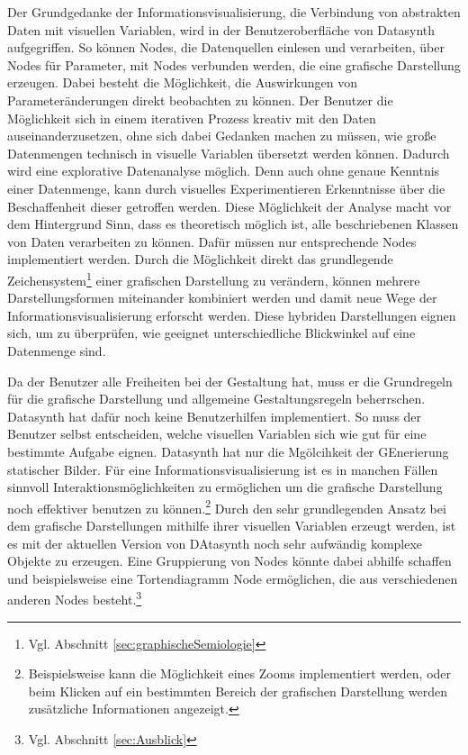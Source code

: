 \documentclass[a4paper, 12pt, DIVcalc, onepage, pdftex, headsepline, footsepline]{scrreprt}
\begin{document}
Der Grundgedanke der Informationsvisualisierung, die Verbindung
von abstrakten Daten mit visuellen Variablen, wird in der Benutzeroberfläche
von Datasynth aufgegriffen. So können Nodes, die Datenquellen einlesen und verarbeiten, über
Nodes für Parameter, mit Nodes verbunden werden, die eine grafische
Darstellung erzeugen. Dabei besteht die Möglichkeit, die Auswirkungen von
Parameteränderungen direkt beobachten zu können.
Der Benutzer die Möglichkeit sich in einem iterativen
Prozess kreativ mit den Daten auseinanderzusetzen, ohne sich dabei Gedanken
machen zu müssen, wie große Datenmengen technisch in visuelle Variablen
übersetzt werden können.
Dadurch wird eine explorative Datenanalyse möglich.
Denn auch ohne genaue Kenntnis einer Datenmenge, kann durch visuelles Experimentieren
Erkenntnisse über die Beschaffenheit dieser getroffen werden.
Diese Möglichkeit der Analyse macht vor dem Hintergrund Sinn, dass es theoretisch
möglich ist, alle beschriebenen Klassen von Daten verarbeiten zu können. Dafür müssen
nur entsprechende Nodes implementiert werden.
Durch die Möglichkeit direkt das grundlegende Zeichensystem\footnote{Vgl. Abschnitt \ref{sec:graphischeSemiologie}} einer
grafischen Darstellung zu verändern, können mehrere Darstellungsformen
miteinander kombiniert werden und damit neue Wege der Informationsvisualisierung erforscht werden.
Diese hybriden Darstellungen eignen sich,
um zu überprüfen, wie geeignet unterschiedliche Blickwinkel auf eine Datenmenge sind.

Da der Benutzer alle Freiheiten bei der Gestaltung hat, muss er die
Grundregeln für die grafische Darstellung und allgemeine Gestaltungsregeln beherrschen.
Datasynth hat dafür noch keine Benutzerhilfen implementiert.
So muss der Benutzer selbst entscheiden, welche visuellen Variablen sich wie 
gut für eine bestimmte Aufgabe eignen.
Datasynth hat nur die Mgölcihkeit der GEnerierung statischer Bilder.
Für eine Informationsvisualisierung ist es in manchen Fällen sinnvoll Interaktionsmöglichkeiten
zu ermöglichen um die grafische Darstellung noch effektiver benutzen zu können.\footnote{Beispielsweise
kann die Möglichkeit eines Zooms implementiert werden, oder beim Klicken auf ein bestimmten
Bereich der grafischen Darstellung werden zusätzliche Informationen angezeigt.}
Durch den sehr grundlegenden Ansatz bei dem grafische Darstellungen mithilfe ihrer
visuellen Variablen erzeugt werden, ist es mit der aktuellen Version von DAtasynth
noch sehr aufwändig komplexe Objekte zu erzeugen. Eine Gruppierung von Nodes
könnte dabei abhilfe schaffen und beispielsweise eine Tortendiagramm Node ermöglichen,
die aus verschiedenen anderen Nodes besteht.\footnote{Vgl. Abschnitt \ref{sec:Ausblick}}
\end{document}
